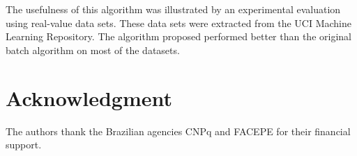 \documentclass[10pt, conference, compsocconf]{IEEEtran}
\begin{document}
The usefulness of this algorithm was illustrated by an experimental evaluation using real-value data sets. These data sets were extracted from the UCI Machine Learning Repository. The algorithm proposed performed better than the original batch algorithm on most of the datasets.



\section*{Acknowledgment}
The authors thank the Brazilian agencies CNPq and FACEPE for their financial support.







%
%






\end{document}
